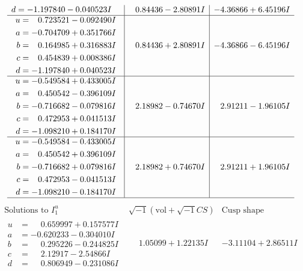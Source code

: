 \documentclass[1p]{elsarticle_modified}
\theoremstyle{definition}
\newcommand{\I}{\sqrt{-1}}
\begin{document}
$$\begin{array}{c|c|c}
\begin{aligned}
d &= -1.197840 - 0.040523 I\end{aligned}
 & \phantom{-}0.84436 - 2.80891 I & -4.36866 + 6.45196 I \\ \hline\begin{aligned}
u &= \phantom{-}0.723521 - 0.092490 I \\
a &= -0.704709 + 0.351766 I \\
b &= \phantom{-}0.164985 + 0.316883 I \\
c &= \phantom{-}0.454839 + 0.008386 I \\
d &= -1.197840 + 0.040523 I\end{aligned}
 & \phantom{-}0.84436 + 2.80891 I & -4.36866 - 6.45196 I \\ \hline\begin{aligned}
u &= -0.549584 + 0.433005 I \\
a &= \phantom{-}0.450542 - 0.396109 I \\
b &= -0.716682 - 0.079816 I \\
c &= \phantom{-}0.472953 + 0.041513 I \\
d &= -1.098210 + 0.184170 I\end{aligned}
 & \phantom{-}2.18982 - 0.74670 I & \phantom{-}2.91211 - 1.96105 I \\ \hline\begin{aligned}
u &= -0.549584 - 0.433005 I \\
a &= \phantom{-}0.450542 + 0.396109 I \\
b &= -0.716682 + 0.079816 I \\
c &= \phantom{-}0.472953 - 0.041513 I \\
d &= -1.098210 - 0.184170 I\end{aligned}
 & \phantom{-}2.18982 + 0.74670 I & \phantom{-}2.91211 + 1.96105 I\\
 \hline 
 \end{array}$$\newpage$$\begin{array}{c|c|c}  
\text{Solutions to }I^u_{1}& \I (\text{vol} + \sqrt{-1}CS) & \text{Cusp shape}\\
 \hline 
\begin{aligned}
u &= \phantom{-}0.659997 + 0.157577 I \\
a &= -0.620233 - 0.304010 I \\
b &= \phantom{-}0.295226 - 0.244825 I \\
c &= \phantom{-}2.12917 - 2.54866 I \\
d &= \phantom{-}0.806949 - 0.231086 I\end{aligned}
 & \phantom{-}1.05099 + 1.22135 I & -3.11104 + 2.86511 I \\ \hline\begin{aligned}

\end{aligned}
\end{array}$$
\end{document}
